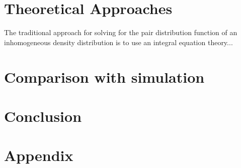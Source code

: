 \documentclass[letterpaper,twocolumn,amsmath,amssymb,pre]{revtex4-1}
\begin{document}
\section{Theoretical Approaches}

The traditional approach for solving for the pair distribution
function of an inhomogeneous density distribution is to use an
integral equation theory...

\section{Comparison with simulation}\label{sec:comparison}

\section{Conclusion}

\appendix

\section*{Appendix}

\end{document}
